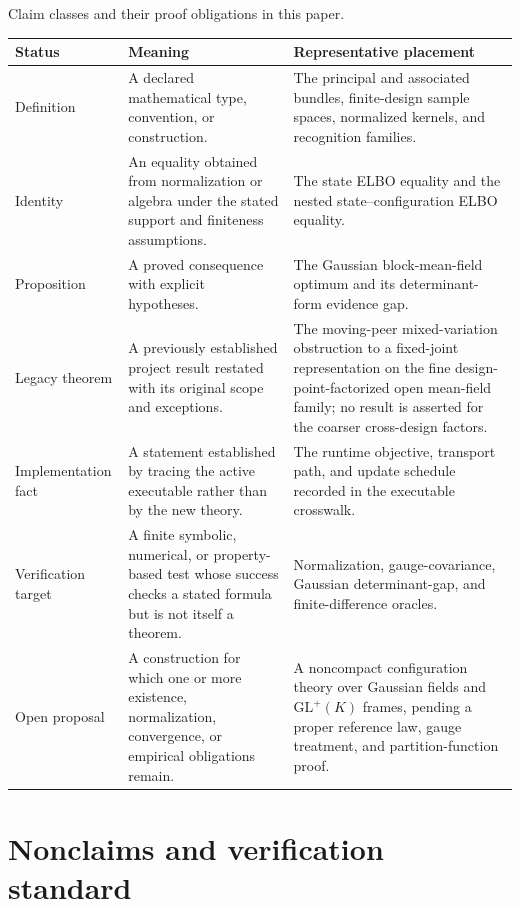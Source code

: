 \begin{sciencetable}{Claim classes and their proof obligations in this paper.}
\label{tab:claim-taxonomy}
\begin{tabularx}{\textwidth}{>{\raggedright\arraybackslash}p{}>{\raggedright\arraybackslash}p{}>{\raggedright\arraybackslash}X}
\toprule
\textbf{Status} & \textbf{Meaning} & \textbf{Representative placement} \\
\midrule
Definition & A declared mathematical type, convention, or construction. & The principal and associated bundles, finite-design sample spaces, normalized kernels, and recognition families. \\
Identity & An equality obtained from normalization or algebra under the stated support and finiteness assumptions. & The state ELBO equality and the nested state--configuration ELBO equality. \\
Proposition & A proved consequence with explicit hypotheses. & The Gaussian block-mean-field optimum and its determinant-form evidence gap. \\
Legacy theorem & A previously established project result restated with its original scope and exceptions. & The moving-peer mixed-variation obstruction to a fixed-joint representation on the fine design-point-factorized open mean-field family; no result is asserted for the coarser cross-design factors. \\
Implementation fact & A statement established by tracing the active executable rather than by the new theory. & The runtime objective, transport path, and update schedule recorded in the executable crosswalk. \\
Verification target & A finite symbolic, numerical, or property-based test whose success checks a stated formula but is not itself a theorem. & Normalization, gauge-covariance, Gaussian determinant-gap, and finite-difference oracles. \\
Open proposal & A construction for which one or more existence, normalization, convergence, or empirical obligations remain. & A noncompact configuration theory over Gaussian fields and \(\mathrm{GL}^{+}(K)\) frames, pending a proper reference law, gauge treatment, and partition-function proof. \\
\bottomrule
\end{tabularx}
\end{sciencetable}

\section{Nonclaims and verification standard}

